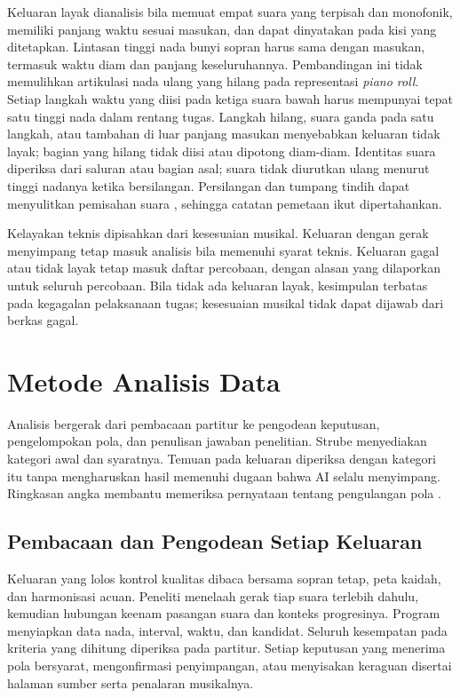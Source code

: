 Keluaran layak dianalisis bila memuat empat suara yang terpisah dan monofonik, memiliki panjang waktu sesuai masukan, dan dapat dinyatakan pada kisi yang ditetapkan. Lintasan tinggi nada bunyi sopran harus sama dengan masukan, termasuk waktu diam dan panjang keseluruhannya. Pembandingan ini tidak memulihkan artikulasi nada ulang yang hilang pada representasi \textit{piano roll}. Setiap langkah waktu yang diisi pada ketiga suara bawah harus mempunyai tepat satu tinggi nada dalam rentang tugas. Langkah hilang, suara ganda pada satu langkah, atau tambahan di luar panjang masukan menyebabkan keluaran tidak layak; bagian yang hilang tidak diisi atau dipotong diam-diam. Identitas suara diperiksa dari saluran atau bagian asal; suara tidak diurutkan ulang menurut tinggi nadanya ketika bersilangan. Persilangan dan tumpang tindih dapat menyulitkan pemisahan suara \parencite{karystinaios2023}, sehingga catatan pemetaan ikut dipertahankan.

Kelayakan teknis dipisahkan dari kesesuaian musikal. Keluaran dengan gerak menyimpang tetap masuk analisis bila memenuhi syarat teknis. Keluaran gagal atau tidak layak tetap masuk daftar percobaan, dengan alasan yang dilaporkan untuk seluruh percobaan. Bila tidak ada keluaran layak, kesimpulan terbatas pada kegagalan pelaksanaan tugas; kesesuaian musikal tidak dapat dijawab dari berkas gagal.

\section{Metode Analisis Data}\label{sec:metode-analisis-data}

Analisis bergerak dari pembacaan partitur ke pengodean keputusan, pengelompokan pola, dan penulisan jawaban penelitian. Strube menyediakan kategori awal dan syaratnya. Temuan pada keluaran diperiksa dengan kategori itu tanpa mengharuskan hasil memenuhi dugaan bahwa AI selalu menyimpang. Ringkasan angka membantu memeriksa pernyataan tentang pengulangan pola \parencite[476--479]{maxwell2010}.

\subsection{Pembacaan dan Pengodean Setiap Keluaran}

Keluaran yang lolos kontrol kualitas dibaca bersama sopran tetap, peta kaidah, dan harmonisasi acuan. Peneliti menelaah gerak tiap suara terlebih dahulu, kemudian hubungan keenam pasangan suara dan konteks progresinya. Program menyiapkan data nada, interval, waktu, dan kandidat. Seluruh kesempatan pada kriteria yang dihitung diperiksa pada partitur. Setiap keputusan yang menerima pola bersyarat, mengonfirmasi penyimpangan, atau menyisakan keraguan disertai halaman sumber serta penalaran musikalnya.

